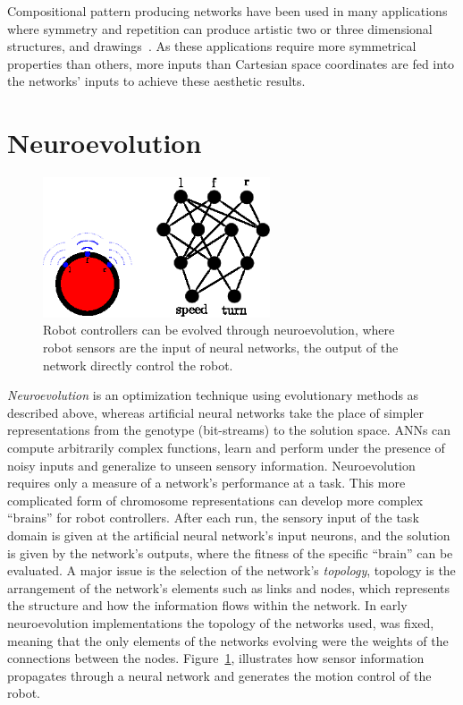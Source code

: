 Compositional pattern producing networks have been used in many applications where symmetry and repetition can produce artistic two or three dimensional structures\cite{endlessforms}, and drawings~\cite{secretan2008picbreeder,picbreederSite}. As these applications require more symmetrical properties than others, more inputs than Cartesian space coordinates are fed into the networks' inputs to achieve these  aesthetic results.



\section{Neuroevolution}

\begin{figure}[b!]
\centering
\includegraphics[width=0.6\textwidth]{../Figures/Misc/robotExample.eps}
\caption{Robot controllers can be evolved through neuroevolution, where robot sensors are the input of neural networks, the output of the network directly control the robot.}
\label{fig:robotExample}
\end{figure}

\emph{Neuroevolution} is an optimization technique using evolutionary methods as described above, whereas artificial neural networks take the place of simpler representations from the genotype (bit-streams) to the solution space. ANNs can compute arbitrarily complex functions, learn and perform under the presence of noisy inputs and generalize to unseen sensory information. Neuroevolution requires only a measure of a network's performance at a task. This more complicated form of chromosome representations can develop more complex ``brains'' for robot controllers. After each run, the sensory input of the task domain is given at the artificial neural network's input neurons, and the solution is given by the network's outputs, where the fitness of the specific ``brain'' can be evaluated. A major issue is the selection of the network's \emph{topology}, topology is the arrangement of the network's elements such as links and nodes, which represents the structure and how the information flows within the network. In early neuroevolution implementations the topology of the networks used, was fixed, meaning that the only elements of the networks evolving were the weights of the connections between the nodes. Figure~\ref{fig:robotExample}, illustrates how sensor information propagates through a neural network and generates the motion control of the robot.




